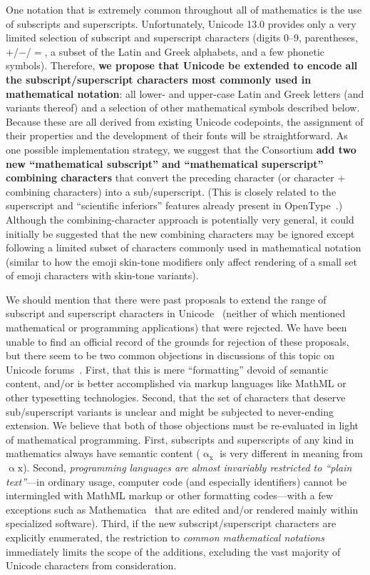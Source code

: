 \documentclass[10pt,english]{article}
\begin{document}
One notation that is extremely common throughout all of mathematics
is the use of subscripts and superscripts. Unfortunately, Unicode
13.0 provides only a very limited selection of subscript and superscript
characters (digits 0--9, parentheses, $+$/$-$/$=$, a subset of
the Latin and Greek alphabets, and a few phonetic symbols). Therefore,\textbf{
we propose that Unicode be extended to encode all the subscript/superscript
characters most commonly used in mathematical notation}: all lower-
and upper-case Latin and Greek letters (and variants thereof) and
a selection of other mathematical symbols described below. Because
these are all derived from existing Unicode codepoints, the assignment
of their properties and the development of their fonts will be straightforward.
As one possible implementation strategy, we suggest that the Consortium
\textbf{add two new ``mathematical subscript'' and ``mathematical
superscript'' combining characters} that convert the preceding character
(or character + combining characters) into a sub/superscript. (This is
closely related to the superscript and ``scientific
inferiors'' features already present in OpenType~\cite{OpenType}.)
Although the combining-character approach is potentially very general, it could
initially be suggested that the new combining characters may be ignored
except following a limited subset of characters commonly used in
mathematical notation (similar to how the emoji skin-tone modifiers only affect
rendering of a small set of emoji characters with skin-tone variants).

We should mention that there were past proposals to extend the range
of subscript and superscript characters in Unicode~\cite{L2-10-230,L2-11-208}
(neither of which mentioned mathematical or programming applications)
that were rejected. We have been unable to find an official record
of the grounds for rejection of these proposals, but there seem to
be two common objections in discussions of this topic on Unicode forums~\cite{Miller10,UCDF}.
First, that this is mere ``formatting''
devoid of semantic content, and/or is better accomplished via markup
languages like MathML or other typesetting technologies. Second, that
the set of characters that deserve sub/superscript variants is unclear
and might be subjected to never-ending extension. We believe that
both of those objections must be re-evaluated in light of mathematical
programming. First, subscripts and superscripts of any kind in mathematics
always have semantic content ($\mathrm{{\upalpha_{x}}}$ is very different
in meaning from $\mathrm{\upalpha\mathrm{{x}}}$). Second, \emph{programming
languages are almost invariably restricted to ``plain text''}---in
ordinary usage, computer code (and especially identifiers) cannot
be intermingled with MathML markup or other formatting codes---with
a few exceptions such as Mathematica~\cite{Mathematica} that are
edited and/or rendered mainly within specialized software). Third,
if the new subscript/superscript characters are explicitly enumerated, the restriction to
\emph{common mathematical notations} immediately limits the scope
of the additions, excluding the vast majority of Unicode characters
from consideration.
\end{document}
